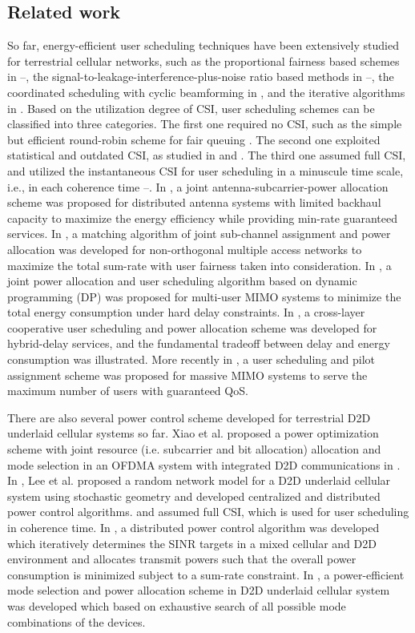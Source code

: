 \documentclass{ieeeaccess}
\begin{document}
\subsection{Related work}
So far, energy-efficient user scheduling techniques have been extensively studied for terrestrial cellular networks, such as the proportional fairness based schemes in \cite{p61}--\cite{p63}, the signal-to-leakage-interference-plus-noise ratio based methods in \cite{p64}--\cite{p66}, the coordinated scheduling with cyclic beamforming in \cite{p67}\cite{p68}, and the iterative algorithms in \cite{p69}\cite{p70}. Based on the utilization degree of CSI, user scheduling schemes can be classified into three categories. The first one required no CSI, such as the simple but efficient round-robin scheme for fair queuing \cite{p51}. The second one exploited statistical and outdated CSI, as studied in \cite{p52} and \cite{p53}. The third one assumed full CSI, and utilized the instantaneous CSI for user scheduling in a minuscule time scale, i.e., in each coherence time \cite{p3}--\cite{p7}. In \cite{p3}, a joint antenna-subcarrier-power allocation scheme was proposed for distributed antenna systems with limited backhaul capacity to maximize the energy efficiency while providing min-rate guaranteed services. In \cite{p6}, a matching algorithm of joint sub-channel assignment and power allocation was developed for non-orthogonal multiple access networks to maximize the total sum-rate with user fairness taken into consideration. In \cite{p4}, a joint power allocation and user scheduling algorithm based on dynamic programming (DP) was proposed for multi-user MIMO systems to minimize the total energy consumption under hard delay constraints. In \cite{p5}, a cross-layer cooperative user scheduling and power allocation scheme was developed for hybrid-delay services, and the fundamental tradeoff between delay and energy consumption was illustrated. More recently in \cite{p7}, a user scheduling and pilot assignment scheme was proposed for massive MIMO systems to serve the maximum number of users with guaranteed QoS.

There are also several power control scheme developed for terrestrial D2D underlaid cellular systems so far. Xiao et al. proposed a power optimization scheme with joint resource (i.e. subcarrier and bit allocation) allocation and mode selection in an OFDMA system with integrated D2D communications in \cite{p801}. In \cite{p802}, Lee et al. proposed a random network model for a D2D underlaid cellular system using stochastic geometry and developed centralized and distributed power control algorithms. \cite{p801} and \cite{p802} assumed full CSI, which is used for user scheduling in coherence time. In \cite{p803}, a distributed power control algorithm was developed which iteratively determines the SINR targets in a mixed cellular and D2D environment and allocates transmit powers such that the overall power consumption is minimized subject to a sum-rate constraint. In \cite{p804}, a power-efficient mode selection and power allocation scheme in D2D underlaid cellular system was developed which based on exhaustive search of all possible mode combinations of the devices.  
\end{document}
